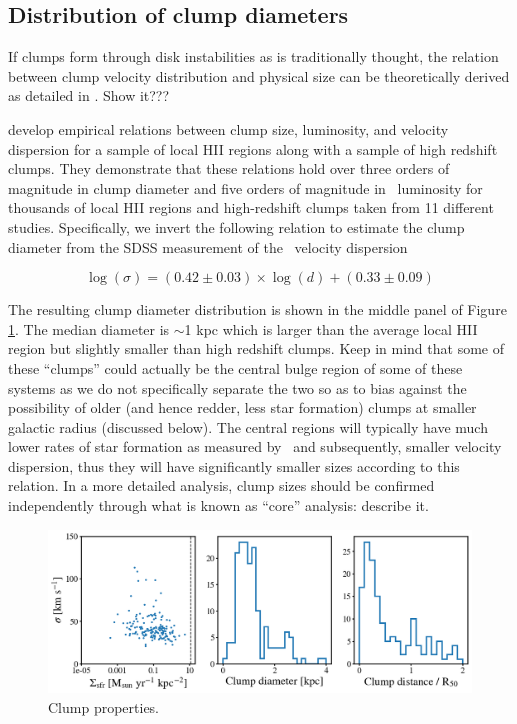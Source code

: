 \subsection{Distribution of clump diameters}
If clumps form through disk instabilities as is traditionally thought, the relation between clump velocity distribution and physical size can be theoretically derived as detailed in \citep[e.g.,][]{Wisnioski2012}. Show it???

\cite{Wisnioski2012} develop empirical relations between clump size, luminosity, and velocity dispersion for a sample of local HII regions along with a sample of high redshift clumps. They demonstrate that these relations hold over three orders of magnitude in clump diameter and five orders of magnitude in \ha~luminosity for thousands of local HII regions and high-redshift clumps taken from 11 different studies. Specifically, we invert the following relation to estimate the clump diameter from the SDSS measurement of the \ha~velocity dispersion

\begin{equation}\label{eqn: clump diameter}
\log(\sigma) = (0.42 \pm 0.03) \times \log(d) + (0.33 \pm 0.09)
\end{equation}

The resulting clump diameter distribution is shown in the middle panel of Figure \ref{fig: clump properties}. The median diameter is $\sim$1 kpc which is larger than the average local HII region but slightly smaller than high redshift clumps.  Keep in mind that some of these ``clumps'' could actually be the central bulge region of some of these systems as we do not specifically separate the two so as to bias against the possibility of older (and hence redder, less star formation) clumps at smaller galactic radius (discussed below). The central regions will typically have much lower rates of star formation as measured by \ha~and subsequently, smaller velocity dispersion, thus they will have significantly smaller sizes according to this relation. In a more detailed analysis, clump sizes should be confirmed independently through what is known as ``core'' analysis:  describe it. 

\begin{figure}
\includegraphics[width=\textwidth]{Figures/clump_sizes_and_sfr_density.png}
\caption[Properties of ``clumps'': velocity dispersion, clump diameter, and clump galactic radial distance.]{Clump properties. }
\label{fig: clump properties}
\end{figure}

